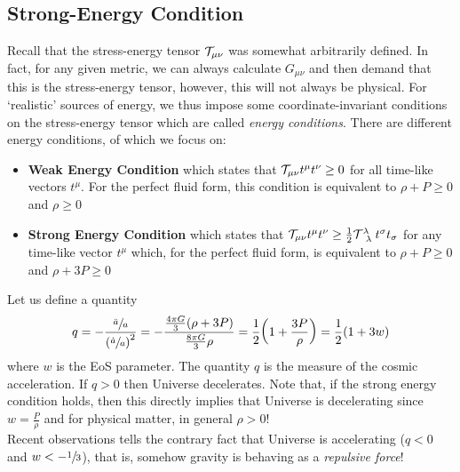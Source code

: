 \subsection{Strong-Energy Condition}
Recall that the stress-energy tensor $\mathcal T_{\mu\nu}$ was somewhat arbitrarily defined. In fact, for any given metric, we can always calculate $G_{\mu\nu}$ and then demand that this is the stress-energy tensor, however, this will not always be physical. For `realistic' sources of energy, we thus impose some coordinate-invariant conditions on the stress-energy tensor which are called \textit{energy conditions}. There are different energy conditions, of which we focus on: 
\begin{itemize}[label=$\blacktriangleright$]
    \item \textbf{Weak Energy Condition} which states that $\mathcal T_{\mu\nu}t^\mu t^\nu\geq 0$ for all time-like vectors $t^\mu$. For the perfect fluid form, this condition is equivalent to $\rho+P\geq 0$ and $\rho\geq 0$
    \item \textbf{Strong Energy Condition} which states that $\ST_{\mu\nu}t^\mu t^\nu\geq  \frac{1}{2}\tensor{\ST}{^\lambda _\lambda}t^\sigma t_\sigma$ for any time-like vector $t^\mu$ which, for the perfect fluid form, is equivalent to $\rho+P\geq 0$ and $\rho+3P\geq 0$
\end{itemize}
Let us define a quantity 
\begin{align*}
    q = -\frac{\sfrac{\ddot{a}}{{a}}}{\qty(\sfrac{\dot{a}}{a})^2} = -\frac{\frac{4\pi G}{3}(\rho+3P)}{\frac{8\pi G}{3}\rho}= \frac{1}{2}\qty(1+\frac{3P}{\rho}) = \frac{1}{2}(1+3w)
\end{align*}
where $w$ is the EoS parameter. The quantity $q$ is the measure of the cosmic acceleration. If $q>0$ then Universe decelerates. Note that, if the strong energy condition holds, then this directly implies that Universe is decelerating since $w=\frac{P}{\rho}$ and for physical matter, in general $\rho>0$!\\[0.2cm]
Recent observations tells the contrary fact that Universe is accelerating ($q<0$ and $w<-\sfrac{1}{3}$), that is, somehow gravity is behaving as a \textit{repulsive force}!
